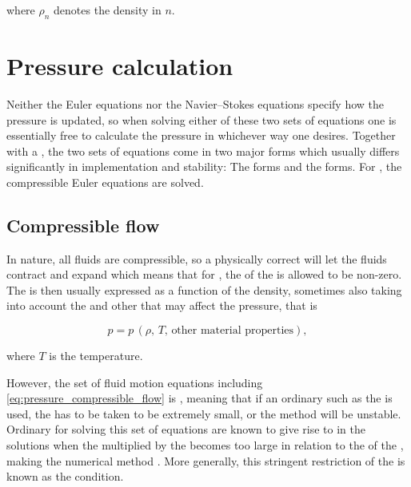 where $\rho_n$ denotes the density in \timestep $n$.

\section{Pressure calculation}
\label{sec:pressure_calculation}

Neither the Euler equations nor the Navier--Stokes equations specify how the pressure is updated, so when solving either of these two sets of equations one is essentially free to calculate the pressure in whichever way one desires. Together with a , the two sets of equations come in two major forms which usually differs significantly in implementation and stability: The \compressible forms and the \incompressible forms. For \thisprojectwork, the compressible Euler equations are solved.

\subsection{Compressible flow}

In nature, all fluids are compressible, so a physically correct  will let the fluids contract and expand which means that for , the \divergence of the  is allowed to be non-zero. The \pressure is then usually expressed as a function of the density, sometimes also taking into account the \temperature and other \properties that may affect the pressure, that is

\begin{equation} \label{eq:pressure_compressible_flow}
p = p\,(\rho,\,T,\,\text{other material properties}),
\end{equation}

where $T$ is the temperature.

However, the set of fluid motion equations including \eqref{eq:pressure_compressible_flow} is , meaning that if an ordinary  such as the  is used, the \timestep has to be taken to be extremely small, or the method will be unstable. Ordinary  for solving this set of equations are known to give rise to  in the solutions when the  multiplied by the  becomes too large in relation to the  of the \cells, making the numerical method \unstable. More generally, this stringent restriction of the \timestep is known as the \CFL condition.

